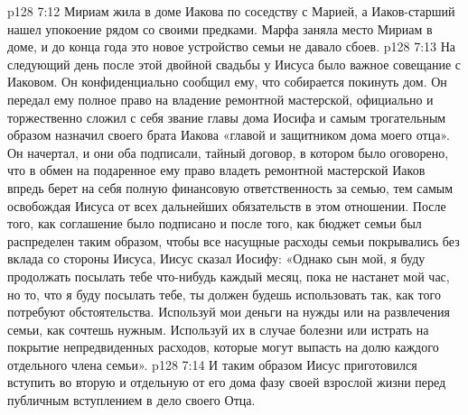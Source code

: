 \vs p128 7:12 Мириам жила в доме Иакова по соседству с Марией, а Иаков\hyp{}старший нашел упокоение рядом со своими предками. Марфа заняла место Мириам в доме, и до конца года это новое устройство семьи не давало сбоев.
\vs p128 7:13 \pc На следующий день после этой двойной свадьбы у Иисуса было важное совещание с Иаковом. Он конфиденциально сообщил ему, что собирается покинуть дом. Он передал ему полное право на владение ремонтной мастерской, официально и торжественно сложил с себя звание главы дома Иосифа и самым трогательным образом назначил своего брата Иакова «главой и защитником дома моего отца». Он начертал, и они оба подписали, тайный договор, в котором было оговорено, что в обмен на подаренное ему право владеть ремонтной мастерской Иаков впредь берет на себя полную финансовую ответственность за семью, тем самым освобождая Иисуса от всех дальнейших обязательств в этом отношении. После того, как соглашение было подписано и после того, как бюджет семьи был распределен таким образом, чтобы все насущные расходы семьи покрывались без вклада со стороны Иисуса, Иисус сказал Иосифу: «Однако сын мой, я буду продолжать посылать тебе что\hyp{}нибудь каждый месяц, пока не настанет мой час, но то, что я буду посылать тебе, ты должен будешь использовать так, как того потребуют обстоятельства. Используй мои деньги на нужды или на развлечения семьи, как сочтешь нужным. Используй их в случае болезни или истрать на покрытие непредвиденных расходов, которые могут выпасть на долю каждого отдельного члена семьи».
\vs p128 7:14 И таким образом Иисус приготовился вступить во вторую и отдельную от его дома фазу своей взрослой жизни перед публичным вступлением в дело своего Отца.
